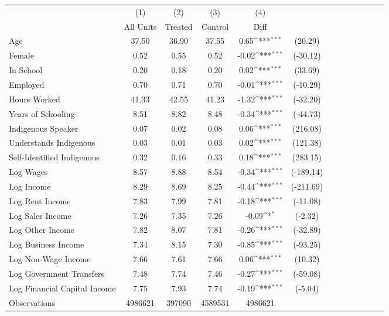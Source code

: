 {
\def\sym#1{\ifmmode^{#1}\else\(^{#1}\)\fi}
\begin{tabular}{l*{4}{ccc}}
\hline\hline
                    &\multicolumn{1}{c}{(1)}&\multicolumn{1}{c}{(2)}&\multicolumn{1}{c}{(3)}&\multicolumn{1}{c}{(4)}         &            \\
                    &   All Units&     Treated&     Control&        Diff         &            \\
\hline
Age                 &       37.50&       36.90&       37.55&        0.65\sym{***}&     (20.29)\\
Female              &        0.52&        0.55&        0.52&       -0.02\sym{***}&    (-30.12)\\
In School           &        0.20&        0.18&        0.20&        0.02\sym{***}&     (33.69)\\
Employed            &        0.70&        0.71&        0.70&       -0.01\sym{***}&    (-10.29)\\
Hours Worked        &       41.33&       42.55&       41.23&       -1.32\sym{***}&    (-32.20)\\
Years of Schooling  &        8.51&        8.82&        8.48&       -0.34\sym{***}&    (-44.73)\\
Indigenous Speaker  &        0.07&        0.02&        0.08&        0.06\sym{***}&    (216.08)\\
Understands Indigenous&        0.03&        0.01&        0.03&        0.02\sym{***}&    (121.38)\\
Self-Identified Indigenous&        0.32&        0.16&        0.33&        0.18\sym{***}&    (283.15)\\
Log Wages           &        8.57&        8.88&        8.54&       -0.34\sym{***}&   (-189.14)\\
Log Income          &        8.29&        8.69&        8.25&       -0.44\sym{***}&   (-211.69)\\
Log Rent Income     &        7.83&        7.99&        7.81&       -0.18\sym{***}&    (-11.08)\\
Log Sales Income    &        7.26&        7.35&        7.26&       -0.09\sym{*}  &     (-2.32)\\
Log Other Income    &        7.82&        8.07&        7.81&       -0.26\sym{***}&    (-32.89)\\
Log Business Income &        7.34&        8.15&        7.30&       -0.85\sym{***}&    (-93.25)\\
Log Non-Wage Income &        7.66&        7.61&        7.66&        0.06\sym{***}&     (10.32)\\
Log Government Transfers&        7.48&        7.74&        7.46&       -0.27\sym{***}&    (-59.08)\\
Log Financial Capital Income&        7.75&        7.93&        7.74&       -0.19\sym{***}&     (-5.04)\\
\hline
Observations        &     4986621&      397090&     4589531&     4986621         &            \\
\hline\hline
\end{tabular}
}
